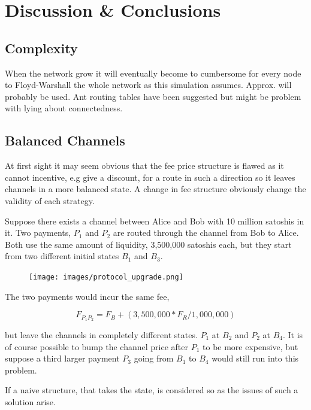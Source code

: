 \chapter{Discussion \& Conclusions}

\section{Complexity}

When the network grow it will eventually become to cumbersome for every node to Floyd-Warshall the whole network as this simulation assumes. Approx. will probably be used. Ant routing tables have been suggested but might be problem with lying about connectedness.

\section{Balanced Channels}

At first sight it may seem obvious that the fee price structure is flawed as it cannot incentive, e.g give a discount, for a route in such a direction so it leaves channels in a more balanced state. A change in fee structure obviously change the validity of each strategy.

Suppose there exists a channel between Alice and Bob with 10 million satoshis in it. 
Two payments, $P_{1}$ and $P_{2}$ are routed through the channel from Bob to Alice.
Both use the same amount of liquidity, 3,500,000 satoshis each, but they start from two different initial states $B_{1}$ and $B_3$.

\begin{figure}[!htb]
	\hspace*{0.7cm} 
	\centering
	\texttt{[image: images/protocol\_upgrade.png]}
	
	\label{fig:xt_nodes}
	\hspace*{2mm} 	
\end{figure}

The two payments would incur the same fee, 

\[ F_{P_1 P_2} = F_B + (3,500,000 * F_R / 1,000,000) \]

but leave the channels in completely different states. $P_1$ at $B_2$ and $P_2$ at $B_4$. It is of course possible to bump the channel price after $P_1$ to
be more expensive, but suppose a third larger payment $P_3$ going from $B_1$ to $B_4$ would still run into this problem.

If a naive structure, that takes the state, is considered so as the issues of such a solution arise. 


